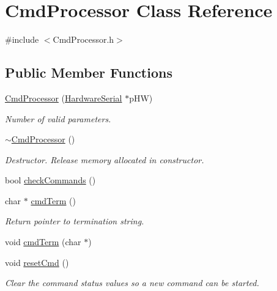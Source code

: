 \hypertarget{class_cmd_processor}{
\section{CmdProcessor Class Reference}
\label{class_cmd_processor}
}


{\ttfamily \#include $<$CmdProcessor.h$>$}

\subsection*{Public Member Functions}
\begin{DoxyCompactItemize}
\item 
\hyperlink{class_cmd_processor_a3594ccb1d9cb0f381315781ad3ac39dc}{CmdProcessor} (\hyperlink{class_hardware_serial}{HardwareSerial} $\ast$pHW)
\begin{DoxyCompactList}\small\item\em Number of valid parameters. \item\end{DoxyCompactList}\item 
\hyperlink{class_cmd_processor_a0e93fa7c4984326769ae51072638f50f}{$\sim$CmdProcessor} ()
\begin{DoxyCompactList}\small\item\em Destructor. Release memory allocated in constructor. \item\end{DoxyCompactList}\item 
bool \hyperlink{class_cmd_processor_ab674755157e105adb18ddeed073f0031}{checkCommands} ()
\item 
char $\ast$ \hyperlink{class_cmd_processor_a6044256dfce5684d00563c5a73f965d9}{cmdTerm} ()
\begin{DoxyCompactList}\small\item\em Return pointer to termination string. \item\end{DoxyCompactList}\item 
void \hyperlink{class_cmd_processor_a8cf275a12c84c86b9311612d134481aa}{cmdTerm} (char $\ast$)
\item 
void \hyperlink{class_cmd_processor_ab6265f95bc945842d519de1aaf5874c9}{resetCmd} ()
\begin{DoxyCompactList}\small\item\em Clear the command status values so a new command can be started. \item\end{DoxyCompactList}\item 

\end{DoxyCompactItemize}

